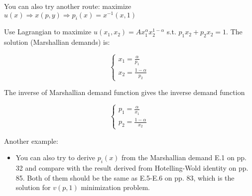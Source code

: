 \documentclass{article}
\begin{document}
\begin{mdframed}[backgroundcolor=blue!20,linecolor=white]
You can also try another route: maximize $u(x) \Rightarrow x(p,y) \Rightarrow p_i(x) = x^{-1}(x,1)$

Use Lagrangian to maximize $u(x_1, x_2) = Ax_1^{\alpha}x_2^{1-\alpha}$
s.t. $p_1x_2 + p_2x_2 = 1$. The solution (Marshallian demands) is:

\begin{equation}
    \begin{cases}
x_1 = \frac{\alpha}{p_1} \\
x_2 = \frac{1-\alpha}{p_2}
    \end{cases}
\nonumber
\end{equation}

The inverse of Marshallian demand function gives the inverse demand function

\begin{equation}
    \begin{cases}
p_1 = \frac{\alpha}{x_1} \\
p_2 = \frac{1-\alpha}{x_2}
    \end{cases}
\nonumber
\end{equation}

Another example:
\begin{itemize}
\item You can also try to derive $p_i(x)$ from the Marshallian demand E.1 on pp. 32 and compare with the result derived from Hotelling-Wold identity on pp. 85. Both of them should be the same as E.5-E.6 on pp. 83, which is the solution for $v(p,1)$ minimization problem.
\end{itemize}


\end{mdframed}
\end{document}
